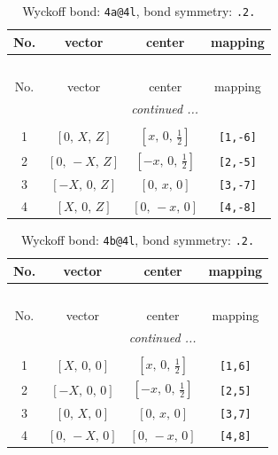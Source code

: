 \documentclass[fleqn,8pt]{jsarticle}
\begin{document}
\begin{longtable}{cccc}
\caption{Wyckoff bond: {\tt 4a@4l}, bond symmetry: {\tt .2.}}
 \\
 \hline \hline
No. & vector & center & mapping \\ \hline \endfirsthead

\multicolumn{3}{l}{\tablename\ \thetable{}} \\
 \hline \hline
No. & vector & center & mapping \\ \hline \endhead

 \hline \hline
\multicolumn{3}{r}{\footnotesize\it continued ...} \\ \endfoot

 \hline \hline
\multicolumn{3}{r}{} \\ \endlastfoot

1 & $\left[ 0,\, X,\, Z \right]$ & $\left[ x,\, 0,\, \frac{1}{2} \right]$ & {\tt [1,-6]} \\ \hline
2 & $\left[ 0,\, - X,\, Z \right]$ & $\left[ - x,\, 0,\, \frac{1}{2} \right]$ & {\tt [2,-5]} \\ \hline
3 & $\left[ - X,\, 0,\, Z \right]$ & $\left[ 0,\, x,\, 0 \right]$ & {\tt [3,-7]} \\ \hline
4 & $\left[ X,\, 0,\, Z \right]$ & $\left[ 0,\, - x,\, 0 \right]$ & {\tt [4,-8]} \\
\end{longtable}
\renewcommand{\arraystretch}{1.2}
\begin{longtable}{cccc}
\caption{Wyckoff bond: {\tt 4b@4l}, bond symmetry: {\tt .2.}}
 \\
 \hline \hline
No. & vector & center & mapping \\ \hline \endfirsthead

\multicolumn{3}{l}{\tablename\ \thetable{}} \\
 \hline \hline
No. & vector & center & mapping \\ \hline \endhead

 \hline \hline
\multicolumn{3}{r}{\footnotesize\it continued ...} \\ \endfoot

 \hline \hline
\multicolumn{3}{r}{} \\ \endlastfoot

1 & $\left[ X,\, 0,\, 0 \right]$ & $\left[ x,\, 0,\, \frac{1}{2} \right]$ & {\tt [1,6]} \\ \hline
2 & $\left[ - X,\, 0,\, 0 \right]$ & $\left[ - x,\, 0,\, \frac{1}{2} \right]$ & {\tt [2,5]} \\ \hline
3 & $\left[ 0,\, X,\, 0 \right]$ & $\left[ 0,\, x,\, 0 \right]$ & {\tt [3,7]} \\ \hline
4 & $\left[ 0,\, - X,\, 0 \right]$ & $\left[ 0,\, - x,\, 0 \right]$ & {\tt [4,8]} \\
\end{longtable}
\end{document}
